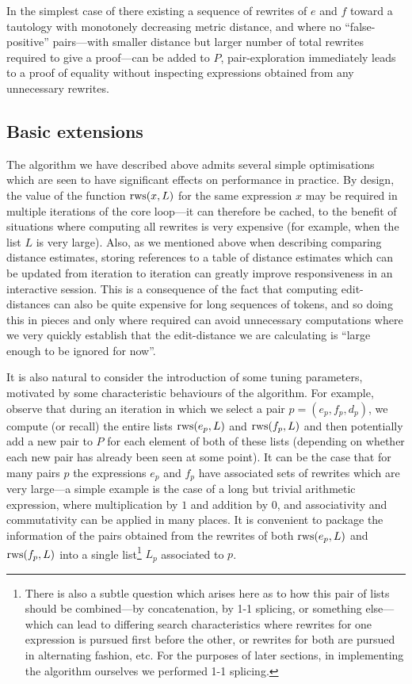 \documentclass[12pt]{article}
\begin{document}
In the simplest case of there existing a sequence of rewrites of $e$ and $f$ toward a tautology with monotonely decreasing metric distance, and where no ``false-positive'' pairs---with smaller distance but larger number of total rewrites required to give a proof---can be added to $P$, pair-exploration immediately leads to a proof of equality without inspecting expressions obtained from any unnecessary rewrites.

\subsection{Basic extensions}

The algorithm we have described above admits several simple optimisations which are seen to have significant effects on performance in practice. By design, the value of the function $\operatorname{rws}(x, L)$ for the same expression $x$ may be required in multiple iterations of the core loop---it can therefore be cached, to the benefit of situations where computing all rewrites is very expensive (for example, when the list $L$ is very large). Also, as we mentioned above when describing comparing distance estimates, storing references to a table of distance estimates which can be updated from iteration to iteration can greatly improve responsiveness in an interactive session. This is a consequence of the fact that computing edit-distances can also be quite expensive for long sequences of tokens, and so doing this in pieces and only where required can avoid unnecessary computations where we very quickly establish that the edit-distance we are calculating is ``large enough to be ignored for now''.

It is also natural to consider the introduction of some tuning parameters, motivated by some characteristic behaviours of the algorithm. For example, observe that during an iteration in which we select a pair $p = (e_p, f_p, d_p)$, we compute (or recall) the entire lists $\operatorname{rws}(e_p, L)$ and $\operatorname{rws}(f_p, L)$ and then potentially add a new pair to $P$ for each element of both of these lists (depending on whether each new pair has already been seen at some point). It can be the case that for many pairs $p$ the expressions $e_p$ and $f_p$ have associated sets of rewrites which are very large---a simple example is the case of a long but trivial arithmetic expression, where multiplication by $1$ and addition by $0$, and associativity and commutativity can be applied in many places. It is convenient to package the information of the pairs obtained from the rewrites of both $\operatorname{rws}(e_p, L)$ and $\operatorname{rws}(f_p, L)$ into a single list\footnote{There is also a subtle question which arises here as to how this pair of lists should be combined---by concatenation, by 1-1 splicing, or something else---which can lead to differing search characteristics where rewrites for one expression is pursued first before the other, or rewrites for both are pursued in alternating fashion, etc. For the purposes of later sections, in implementing the algorithm ourselves we performed 1-1 splicing.} $L_p$ associated to $p$.
\end{document}
